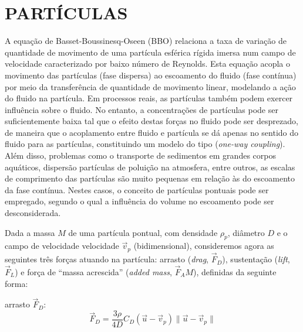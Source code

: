 \typeout{ ====================================================================}
\typeout{ ====================================================================}

\section{PARTÍCULAS}

A equação de Basset-Boussinesq-Oseen (BBO) relaciona a taxa de variação
de quantidade de movimento de uma partícula esférica rígida imersa num
campo de velocidade caracterizado por baixo número de Reynolds. Esta
equação acopla o movimento das partículas (fase dispersa) ao escoamento
do fluido (fase contínua) por meio da transferência de quantidade de
movimento linear, modelando a ação do fluido na partícula. Em processos
reais, as partículas também podem exercer influência sobre o fluido. No
entanto, a concentrações de partículas pode ser suficientemente baixa
tal que o efeito destas forças no fluido pode ser desprezado, de maneira
que o acoplamento entre fluido e partícula se dá apenas no sentido do
fluido para as partículas, constituindo um modelo do tipo ({\it one-way
coupling}). Além disso, problemas como o transporte de sedimentos em
grandes corpos aquáticos, dispersão partículas de poluição na atmosfera,
entre outros, as escalas de comprimento das partículas são muito
pequenas em relação às do escoamento da fase contínua. Nestes casos, o
conceito de partículas pontuais pode ser empregado, segundo o qual a
influência do volume no escoamento pode ser desconsiderada.


Dada a massa $M$ de uma partícula pontual, com densidade $\rho_p$,
diâmetro $D$ e o campo de velocidade velocidade $\vec{v}_p$
(bidimensional), consideremos agora as seguintes três forças atuando na
partícula: arrasto ({\it drag}, $\vec{F}_D$), sustentação ({\it lift},
$\vec{F}_L$) e força de ``massa acrescida'' ({\it added mass},
$\vec{F}_AM$), definidas da seguinte forma:

arrasto $\vec{F}_D$:
\begin{equation}
\vec{F}_D = \frac{3\rho}{4D}C_D(\vec{u}-\vec{v}_p)\parallel\vec{u}-\vec{v}_p\parallel
\label{eq:arrasto}
\end{equation}

